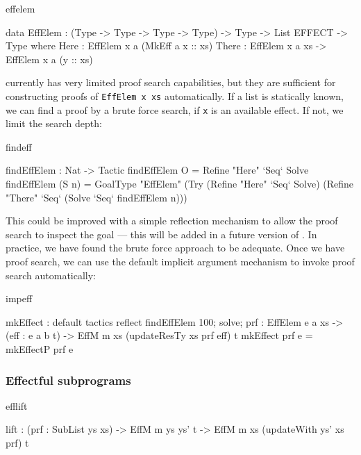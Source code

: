 \begin{SaveVerbatim}{effelem}

data EffElem : (Type -> Type -> Type -> Type) -> 
               Type -> List EFFECT -> Type where
     Here : EffElem x a (MkEff a x :: xs)
     There : EffElem x a xs -> EffElem x a (y :: xs)

\end{SaveVerbatim}

\Idris{} currently has very limited proof search capabilities, but they
are sufficient for constructing proofs of \texttt{EffElem x xs} automatically.
If a list is statically known, we can find a proof
by a brute force search, if \texttt{x} is an available effect. If not, we limit
the search depth:

\begin{SaveVerbatim}{findeff}

findEffElem : Nat -> Tactic 
findEffElem O = Refine "Here" `Seq` Solve 
findEffElem (S n) = GoalType "EffElem" 
      (Try (Refine "Here" `Seq` Solve)
           (Refine "There" `Seq` 
                   (Solve `Seq` findEffElem n)))

\end{SaveVerbatim}

\noindent
This could be improved with a simple reflection mechanism to allow the proof
search to inspect the goal --- this will be added in a future version of \Idris{}.
In practice, we have found the brute force approach to be adequate. Once we
have proof search, we can use the default implicit argument mechanism to
invoke proof search automatically:

\label{sect:mkeffect}
\begin{SaveVerbatim}{impeff}

mkEffect : {default tactics { 
                       reflect findEffElem 100; 
                       solve; 
                    } 
              prf : EffElem e a xs} -> 
           (eff : e a b t) -> 
           EffM m xs (updateResTy xs prf eff) t
mkEffect {prf} e = mkEffectP prf e

\end{SaveVerbatim}

\subsubsection*{Effectful subprograms}

\begin{SaveVerbatim}{efflift}

lift : (prf : SubList ys xs) ->
       EffM m ys ys' t -> 
       EffM m xs (updateWith ys' xs prf) t

\end{SaveVerbatim}

